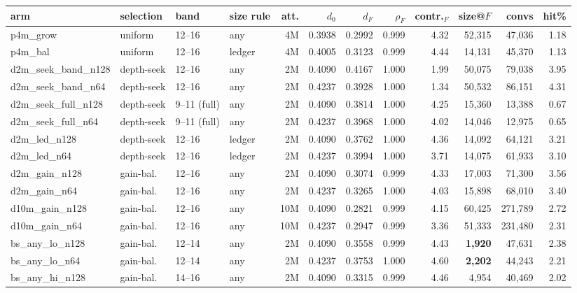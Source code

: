 \documentclass[11pt]{article}
\begin{document}
\begin{center}\scriptsize
\begin{tabular}{llllrrrrrrrr}
\toprule
arm & selection & band & size rule & att. & $d_0$ & $d_F$ & $\rho_F$ & contr.$_F$ & size@$F$ & convs & hit\%\\
\midrule
p4m\_grow & uniform & 12--16 & any & 4M & 0.3938 & 0.2992 & 0.999 & 4.32 & 52{,}315 & 47{,}036 & 1.18\\
p4m\_bal & uniform & 12--16 & ledger & 4M & 0.4005 & 0.3123 & 0.999 & 4.44 & 14{,}131 & 45{,}370 & 1.13\\
d2m\_seek\_band\_n128 & depth-seek & 12--16 & any & 2M & 0.4090 & 0.4167 & 1.000 & 1.99 & 50{,}075 & 79{,}038 & 3.95\\
d2m\_seek\_band\_n64 & depth-seek & 12--16 & any & 2M & 0.4237 & 0.3928 & 1.000 & 1.34 & 50{,}532 & 86{,}151 & 4.31\\
d2m\_seek\_full\_n128 & depth-seek & 9--11 (full) & any & 2M & 0.4090 & 0.3814 & 1.000 & 4.25 & 15{,}360 & 13{,}388 & 0.67\\
d2m\_seek\_full\_n64 & depth-seek & 9--11 (full) & any & 2M & 0.4237 & 0.3968 & 1.000 & 4.02 & 14{,}046 & 12{,}975 & 0.65\\
d2m\_led\_n128 & depth-seek & 12--16 & ledger & 2M & 0.4090 & 0.3762 & 1.000 & 4.36 & 14{,}092 & 64{,}121 & 3.21\\
d2m\_led\_n64 & depth-seek & 12--16 & ledger & 2M & 0.4237 & 0.3994 & 1.000 & 3.71 & 14{,}075 & 61{,}933 & 3.10\\
d2m\_gain\_n128 & gain-bal. & 12--16 & any & 2M & 0.4090 & 0.3074 & 0.999 & 4.33 & 17{,}003 & 71{,}300 & 3.56\\
d2m\_gain\_n64 & gain-bal. & 12--16 & any & 2M & 0.4237 & 0.3265 & 1.000 & 4.03 & 15{,}898 & 68{,}010 & 3.40\\
d10m\_gain\_n128 & gain-bal. & 12--16 & any & 10M & 0.4090 & 0.2821 & 0.999 & 4.15 & 60{,}425 & 271{,}789 & 2.72\\
d10m\_gain\_n64 & gain-bal. & 12--16 & any & 10M & 0.4237 & 0.2947 & 0.999 & 3.36 & 51{,}333 & 231{,}480 & 2.31\\
bs\_any\_lo\_n128 & gain-bal. & 12--14 & any & 2M & 0.4090 & 0.3558 & 0.999 & 4.43 & \textbf{1{,}920} & 47{,}631 & 2.38\\
bs\_any\_lo\_n64 & gain-bal. & 12--14 & any & 2M & 0.4237 & 0.3753 & 1.000 & 4.60 & \textbf{2{,}202} & 44{,}243 & 2.21\\
bs\_any\_hi\_n128 & gain-bal. & 14--16 & any & 2M & 0.4090 & 0.3315 & 0.999 & 4.46 & 4{,}954 & 40{,}469 & 2.02\\

\end{tabular}
\end{center}
\end{document}
